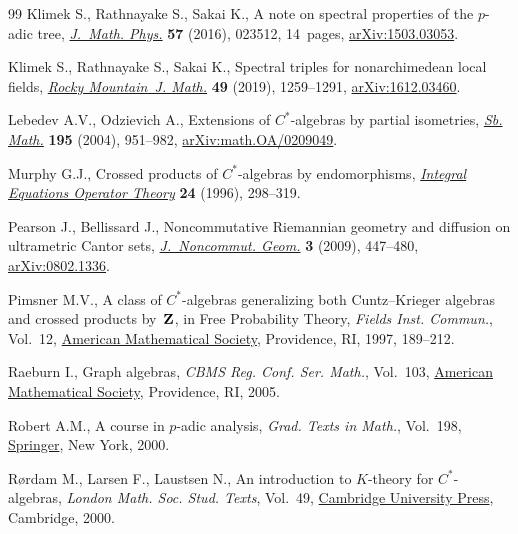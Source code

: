 \documentclass[10pt,a4paper]{amsart}
\numberwithin{equation}{section}
\begin{document}
\begin{thebibliography}{99}
Klimek S., Rathnayake S., Sakai K., A note on spectral properties of the
 {$p$}-adic tree, \href{https://doi.org/10.1063/1.4940339}{\textit{J.~Math.
 Phys.}} \textbf{57} (2016), 023512, 14~pages,
 \href{http://arxiv.org/abs/1503.03053}{arXiv:1503.03053}.

Klimek S., Rathnayake S., Sakai K., Spectral triples for nonarchimedean local
 fields, \href{https://doi.org/10.1216/RMJ-2019-49-4-1259}{\textit{Rocky
 Mountain~J. Math.}} \textbf{49} (2019), 1259--1291,
 \href{http://arxiv.org/abs/1612.03460}{arXiv:1612.03460}.

Lebedev A.V., Odzievich A., Extensions of {$C^\ast$}-algebras by partial
 isometries,
 \href{https://doi.org/10.1070/SM2004v195n07ABEH000834}{\textit{Sb. Math.}}
 \textbf{195} (2004), 951--982,
 \href{http://arxiv.org/abs/math.OA/0209049}{arXiv:math.OA/0209049}.

Murphy G.J., Crossed products of {$C^*$}-algebras by endomorphisms,
 \href{https://doi.org/10.1007/BF01204603}{\textit{Integral Equations Operator
 Theory}} \textbf{24} (1996), 298--319.

Pearson J., Bellissard J., Noncommutative {R}iemannian geometry and diffusion
 on ultrametric {C}antor sets,
 \href{https://doi.org/10.4171/JNCG/43}{\textit{J.~Noncommut. Geom.}}
 \textbf{3} (2009), 447--480,
 \href{http://arxiv.org/abs/0802.1336}{arXiv:0802.1336}.

Pimsner M.V., A class of {$C^*$}-algebras generalizing both {C}untz--{K}rieger
 algebras and crossed products by~{${\bf Z}$}, in Free {P}robability {T}heory,
 \textit{Fields Inst. Commun.}, Vol.~12,
 \href{https://doi.org/10.1090/fic/012/08}{American Mathematical Society},
 Providence, RI, 1997, 189--212.

Raeburn I., Graph algebras, \textit{CBMS Reg. Conf. Ser. Math.}, Vol.~103,
 \href{https://doi.org/10.1090/cbms/103}{American Mathematical Society},
 Providence, RI, 2005.

Robert A.M., A course in {$p$}-adic analysis, \textit{Grad. Texts in Math.},
 Vol.~198, \href{https://doi.org/10.1007/978-1-4757-3254-2}{Springer}, New
 York, 2000.

R{\o}rdam M., Larsen F., Laustsen N., An introduction to {$K$}-theory for
 {$C^*$}-algebras, \textit{London Math. Soc. Stud. Texts}, Vol.~49,
 \href{https://doi.org/10.1017/CBO9780511623806}{Cambridge University Press},
 Cambridge, 2000.


\end{thebibliography}
\end{document}
